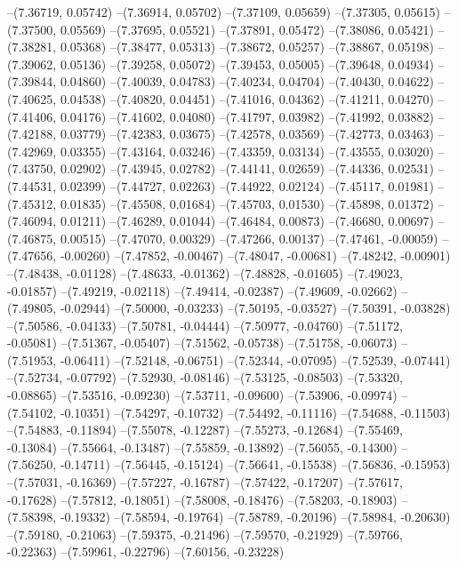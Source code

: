 --(7.36719, 0.05742)
--(7.36914, 0.05702)
--(7.37109, 0.05659)
--(7.37305, 0.05615)
--(7.37500, 0.05569)
--(7.37695, 0.05521)
--(7.37891, 0.05472)
--(7.38086, 0.05421)
--(7.38281, 0.05368)
--(7.38477, 0.05313)
--(7.38672, 0.05257)
--(7.38867, 0.05198)
--(7.39062, 0.05136)
--(7.39258, 0.05072)
--(7.39453, 0.05005)
--(7.39648, 0.04934)
--(7.39844, 0.04860)
--(7.40039, 0.04783)
--(7.40234, 0.04704)
--(7.40430, 0.04622)
--(7.40625, 0.04538)
--(7.40820, 0.04451)
--(7.41016, 0.04362)
--(7.41211, 0.04270)
--(7.41406, 0.04176)
--(7.41602, 0.04080)
--(7.41797, 0.03982)
--(7.41992, 0.03882)
--(7.42188, 0.03779)
--(7.42383, 0.03675)
--(7.42578, 0.03569)
--(7.42773, 0.03463)
--(7.42969, 0.03355)
--(7.43164, 0.03246)
--(7.43359, 0.03134)
--(7.43555, 0.03020)
--(7.43750, 0.02902)
--(7.43945, 0.02782)
--(7.44141, 0.02659)
--(7.44336, 0.02531)
--(7.44531, 0.02399)
--(7.44727, 0.02263)
--(7.44922, 0.02124)
--(7.45117, 0.01981)
--(7.45312, 0.01835)
--(7.45508, 0.01684)
--(7.45703, 0.01530)
--(7.45898, 0.01372)
--(7.46094, 0.01211)
--(7.46289, 0.01044)
--(7.46484, 0.00873)
--(7.46680, 0.00697)
--(7.46875, 0.00515)
--(7.47070, 0.00329)
--(7.47266, 0.00137)
--(7.47461, -0.00059)
--(7.47656, -0.00260)
--(7.47852, -0.00467)
--(7.48047, -0.00681)
--(7.48242, -0.00901)
--(7.48438, -0.01128)
--(7.48633, -0.01362)
--(7.48828, -0.01605)
--(7.49023, -0.01857)
--(7.49219, -0.02118)
--(7.49414, -0.02387)
--(7.49609, -0.02662)
--(7.49805, -0.02944)
--(7.50000, -0.03233)
--(7.50195, -0.03527)
--(7.50391, -0.03828)
--(7.50586, -0.04133)
--(7.50781, -0.04444)
--(7.50977, -0.04760)
--(7.51172, -0.05081)
--(7.51367, -0.05407)
--(7.51562, -0.05738)
--(7.51758, -0.06073)
--(7.51953, -0.06411)
--(7.52148, -0.06751)
--(7.52344, -0.07095)
--(7.52539, -0.07441)
--(7.52734, -0.07792)
--(7.52930, -0.08146)
--(7.53125, -0.08503)
--(7.53320, -0.08865)
--(7.53516, -0.09230)
--(7.53711, -0.09600)
--(7.53906, -0.09974)
--(7.54102, -0.10351)
--(7.54297, -0.10732)
--(7.54492, -0.11116)
--(7.54688, -0.11503)
--(7.54883, -0.11894)
--(7.55078, -0.12287)
--(7.55273, -0.12684)
--(7.55469, -0.13084)
--(7.55664, -0.13487)
--(7.55859, -0.13892)
--(7.56055, -0.14300)
--(7.56250, -0.14711)
--(7.56445, -0.15124)
--(7.56641, -0.15538)
--(7.56836, -0.15953)
--(7.57031, -0.16369)
--(7.57227, -0.16787)
--(7.57422, -0.17207)
--(7.57617, -0.17628)
--(7.57812, -0.18051)
--(7.58008, -0.18476)
--(7.58203, -0.18903)
--(7.58398, -0.19332)
--(7.58594, -0.19764)
--(7.58789, -0.20196)
--(7.58984, -0.20630)
--(7.59180, -0.21063)
--(7.59375, -0.21496)
--(7.59570, -0.21929)
--(7.59766, -0.22363)
--(7.59961, -0.22796)
--(7.60156, -0.23228)

